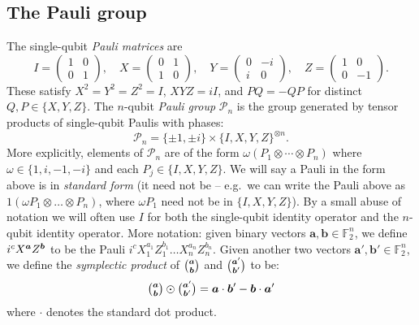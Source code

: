 \subsection{The Pauli group}\label{subsec:pauli_group}

The single-qubit \emph{Pauli matrices} are
\begin{equation}
    I = \begin{pmatrix} 1 & 0 \\ 0 & 1 \end{pmatrix}, \quad
    X = \begin{pmatrix} 0 & 1 \\ 1 & 0 \end{pmatrix}, \quad
    Y = \begin{pmatrix} 0 & -i \\ i & 0 \end{pmatrix}, \quad
    Z = \begin{pmatrix} 1 & 0 \\ 0 & -1 \end{pmatrix}.
\end{equation}
These satisfy $X^2 = Y^2 = Z^2 = I$, $XYZ = iI$, and $PQ = -QP$ for distinct $Q, P \in \{X, Y, Z\}$.
The $n$-qubit \emph{Pauli group} $\mathcal{P}_n$ is the group generated by tensor products of single-qubit Paulis with phases:
\begin{equation}
    \mathcal{P}_n = \{ \pm 1, \pm i \} \times \{ I, X, Y, Z \}^{\otimes n}.
\end{equation}
More explicitly, elements of $\mathcal{P}_n$ are of the form $\omega (P_1 \otimes \cdots \otimes P_n)$ where $\omega \in \{1, i, -1, -i\}$ and each $P_j \in \{I, X, Y, Z\}$.
We will say a Pauli in the form above is in \textit{standard form} (it need not be -- e.g.\ we can write the Pauli above as $1 (\omega P_1 \otimes \ldots \otimes P_n)$, where $\omega P_1$ need not be in $\{I, X, Y, Z\}$).
By a small abuse of notation we will often use $I$ for both the single-qubit identity operator and the $n$-qubit identity operator.
More notation: given binary vectors $\boldsymbol{a}, \boldsymbol{b} \in \mathbb{F}_2^n$, we define $i^c X^{\boldsymbol{a}}Z^{\boldsymbol{b}}$ to be the Pauli $i^c X_1^{a_1} Z_1^{b_1} \ldots X_n^{a_n} Z_n^{b_n}$.
Given another two vectors $\boldsymbol{a}', \boldsymbol{b}' \in \mathbb{F}_2^n$, we define the \textit{symplectic product} of $\binom{\boldsymbol{a}}{\boldsymbol{b}}$ and $\binom{\boldsymbol{a}'}{\boldsymbol{b}'}$ to be:
\begin{equation}
    \tbinom{\boldsymbol{a}}{\boldsymbol{b}} \odot \tbinom{\boldsymbol{a}'}{\boldsymbol{b}'} = \boldsymbol{a} \cdot \boldsymbol{b}' - \boldsymbol{b} \cdot \boldsymbol{a}'
\end{equation}
where $\cdot$ denotes the standard dot product.

